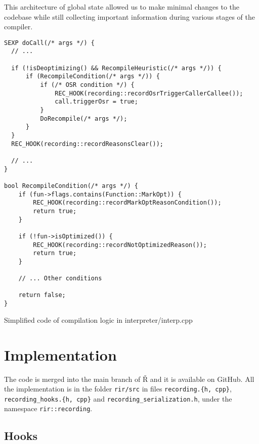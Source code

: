 This architecture of global state allowed us to make minimal changes to the codebase while still collecting important information during various stages of the compiler.

\begin{listing}
	\centering
	\begin{verbatim}
SEXP doCall(/* args */) {
  // ...

  if (!isDeoptimizing() && RecompileHeuristic(/* args */)) {
      if (RecompileCondition(/* args */)) {
          if (/* OSR condition */) {
              REC_HOOK(recording::recordOsrTriggerCallerCallee());
              call.triggerOsr = true;
          }
          DoRecompile(/* args */);
      }
  }
  REC_HOOK(recording::recordReasonsClear());

  // ...
}

bool RecompileCondition(/* args */) {
    if (fun->flags.contains(Function::MarkOpt)) {
        REC_HOOK(recording::recordMarkOptReasonCondition());
        return true;
    }

    if (!fun->isOptimized()) {
        REC_HOOK(recording::recordNotOptimizedReason());
        return true;
    }

    // ... Other conditions

    return false;
}
  \end{verbatim}
	\caption{Simplified code of compilation logic in interpreter/interp.cpp}\label{lst:hook-docall}
\end{listing}

\section{Implementation}

The code is merged into the main branch of Ř and it is available on GitHub\cite{rsh-github}. All the implementation is in the folder \texttt{rir/src} in files \texttt{recording.\{h, cpp\}}, \texttt{recording\_hooks.\{h, cpp\}} and \texttt{recording\_serialization.h}, under the name\-space \texttt{rir::recording}.

\subsection{Hooks}

